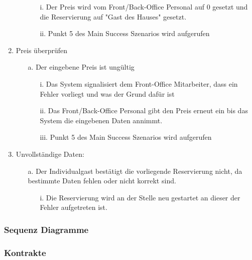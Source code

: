 \documentclass[./detailed_overview_usecases.tex]{subfiles}
\begin{document}
\begin{enumerate}
\begin{itemize}
                \begin{itemize}
                    \item[i.] Der Preis wird vom Front/Back-Office Personal auf 0 gesetzt und die Reservierung auf "Gast des Hauses" gesetzt.
                    \item[ii.] Punkt 5 des Main Success Szenarios wird aufgerufen
                \end{itemize}
            \end{itemize}
        \item Preis überprüfen
        \begin{itemize}
            \item[a.] Der eingebene Preis ist ungültig
            \begin{itemize}
                \item[i.] Das System signalisiert dem Front-Office Mitarbeiter, dass ein Fehler vorliegt und was der Grund dafür ist
                \item[ii.] Das Front/Back-Office Personal gibt den Preis erneut ein bis das System die eingebenen Daten annimmt.
                \item[iii.] Punkt 5 des Main Success Szenarios wird aufgerufen
            \end{itemize}
        \end{itemize}
        \setcounter{enumi}{8}
        \item Unvollständige Daten: \begin{itemize}
                                        \item[a.] Der Individualgast bestätigt die vorliegende Reservierung nicht, da bestimmte Daten fehlen oder nicht korrekt sind.
                                        \begin{itemize}
                                            \item[i.] Die Reservierung wird an der Stelle neu gestartet an dieser der Fehler aufgetreten ist.
                                        \end{itemize}
                                    \end{itemize}
    \end{enumerate}

    \subsubsection{Sequenz Diagramme}
    \subsubsection{Kontrakte}
\end{document}
